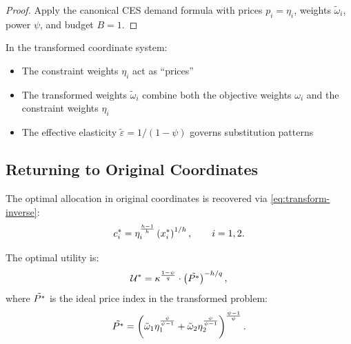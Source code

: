 \begin{proof}
Apply the canonical CES demand formula with prices $p_i = \eta_i$, weights $\tilde{\omega}_i$, power $\psi$, and budget $B = 1$.
\end{proof}

\begin{callouttip}[Interpretation]
In the transformed coordinate system:
\begin{itemize}[leftmargin=*]
    \item The constraint weights $\eta_i$ act as ``prices''
    \item The transformed weights $\tilde{\omega}_i$ combine both the objective weights $\omega_i$ and the constraint weights $\eta_i$
    \item The effective elasticity $\tilde{\varepsilon} = 1/(1-\psi)$ governs substitution patterns
\end{itemize}
\end{callouttip}

\subsection{Returning to Original Coordinates}
\label{subsec:return-original}

The optimal allocation in original coordinates is recovered via \eqref{eq:transform-inverse}:
\begin{equation}
\label{eq:c-star}
c_i^{*} = \eta_i^{\frac{h-1}{h}} \left( x_i^{*} \right)^{1/h}, \qquad i = 1, 2.
\end{equation}

\begin{proposition}
\label{prop:optimal-value}
The optimal utility is:
\begin{equation}
\label{eq:U-star}
\mathcal{U}^{*} = \kappa^{\frac{1-\psi}{q}} \cdot \left( \tilde{P^{*}} \right)^{-h/q},
\end{equation}
where $\tilde{P^{*}}$ is the ideal price index in the transformed problem:
\begin{equation}
\tilde{P^{*}} = \left( \tilde{\omega}_1 \eta_1^{\frac{\psi}{\psi-1}} + \tilde{\omega}_2 \eta_2^{\frac{\psi}{\psi-1}} \right)^{\frac{\psi-1}{\psi}}.
\end{equation}
\end{proposition}

